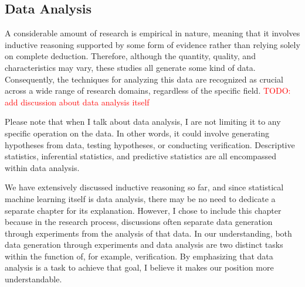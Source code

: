 \documentclass{book}
\begin{document}


\subsection{Data Analysis}
A considerable amount of research is empirical in nature, meaning that it involves inductive reasoning supported by some form of evidence rather than relying solely on complete deduction. Therefore, although the quantity, quality, and characteristics may vary, these studies all generate some kind of data. Consequently, the techniques for analyzing this data are recognized as crucial across a wide range of research domains, regardless of the specific field. \textcolor{red}{TODO: add discussion about data analysis itself}

Please note that when I talk about data analysis, I are not limiting it to any specific operation on the data. In other words, it could involve generating hypotheses from data, testing hypotheses, or conducting verification. Descriptive statistics, inferential statistics, and predictive statistics are all encompassed within data analysis.

We have extensively discussed inductive reasoning so far, and since statistical machine learning itself is data analysis, there may be no need to dedicate a separate chapter for its explanation. However, I chose to include this chapter because in the research process, discussions often separate data generation through experiments from the analysis of that data. In our understanding, both data generation through experiments and data analysis are two distinct tasks within the function of, for example, verification. By emphasizing that data analysis is a task to achieve that goal, I believe it makes our position more understandable. 
\end{document}
